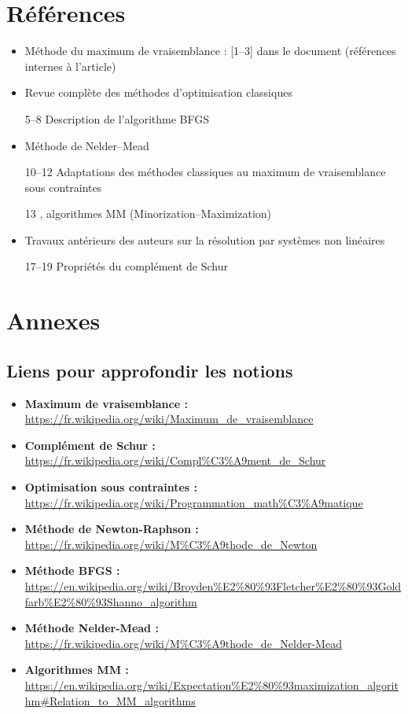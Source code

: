 \documentclass[12pt,a4paper]{article}
\begin{document}
	\section{Références} %
	\begin{itemize}
		\item Méthode du maximum de vraisemblance : [1–3] dans le document (références internes à l’article)
		\item Revue complète des méthodes d’optimisation classiques
		\item [5–8] Description de l’algorithme BFGS
		\item Méthode de Nelder–Mead
		\item [10–12] Adaptations des méthodes classiques au maximum de vraisemblance sous contraintes
		\item [13], algorithmes MM (Minorization–Maximization)
		\item Travaux antérieurs des auteurs sur la résolution par systèmes non linéaires
		\item [17–19] Propriétés du complément de Schur
	\end{itemize}
	
	\section{Annexes} %
	
	\subsection{Liens pour approfondir les notions} %
	\begin{itemize}
		\item \textbf{Maximum de vraisemblance :} \url{https://fr.wikipedia.org/wiki/Maximum_de_vraisemblance}
		\item \textbf{Complément de Schur :} \url{https://fr.wikipedia.org/wiki/Compl%C3%A9ment_de_Schur}
		\item \textbf{Optimisation sous contraintes :} \url{https://fr.wikipedia.org/wiki/Programmation_math%C3%A9matique}
		\item \textbf{Méthode de Newton-Raphson :} \url{https://fr.wikipedia.org/wiki/M%C3%A9thode_de_Newton}
		\item \textbf{Méthode BFGS :} \url{https://en.wikipedia.org/wiki/Broyden%E2%80%93Fletcher%E2%80%93Goldfarb%E2%80%93Shanno_algorithm}
		\item \textbf{Méthode Nelder-Mead :} \url{https://fr.wikipedia.org/wiki/M%C3%A9thode_de_Nelder-Mead}
		\item \textbf{Algorithmes MM :} \url{https://en.wikipedia.org/wiki/Expectation%E2%80%93maximization_algorithm#Relation_to_MM_algorithms}
	\end{itemize}
	
\end{document}
